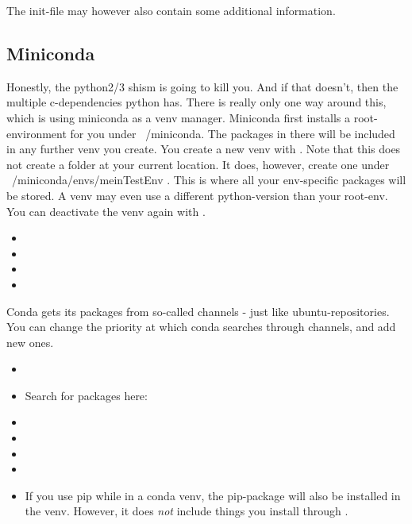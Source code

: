 The init-file may however also contain some additional information. 


\subsection{Miniconda}
Honestly, the python2/3 shism is going to kill you. And if that doesn't, then the multiple c-dependencies python has. There is really only one way around this, which is using miniconda as a venv manager.
Miniconda first installs a root-environment for you under ~/miniconda. The packages in there will be included in any further venv you create. 
You create a new venv with . Note that this does not create a folder at your current location. It does, however, create one under ~/miniconda/envs/meinTestEnv . This is where all your env-specific packages will be stored. A venv may even use a different python-version than your root-env.
You can deactivate the venv again with .

\begin{itemize}
    \item {}
    \item {}
    \item {}
    \item {}
\end{itemize}

Conda gets its packages from so-called channels - just like ubuntu-repositories. You can change the priority at which conda searches through channels, and add new ones. 

\begin{itemize}
    \item {}
    \item Search for packages here: 
    \item {}
    \item {}
    \item {}
    \item {}
    \item If you use pip while in a conda venv, the pip-package will also be installed in the venv. However, it does \emph{not} include things you install through .
\end{itemize}



